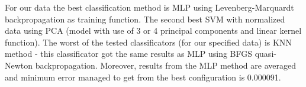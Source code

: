 \documentclass[
10pt, %
a4paper, %
oneside, %
headinclude,footinclude, %
BCOR5mm, %
]{scrartcl}
\begin{document}
For our data the best classification method is  MLP using Levenberg-Marquardt backpropagation as training function. The second best SVM with normalized data using PCA (model with use of 3 or 4 principal components and linear kernel function). The worst of the tested classificators (for our specified data) is KNN method - this classificator got the same results as MLP using BFGS quasi-Newton backpropagation. Moreover, results from the MLP method are averaged and minimum error managed to get from the best configuration is 0.000091.


\renewcommand{\refname}{\spacedlowsmallcaps{References}} %




\end{document}
